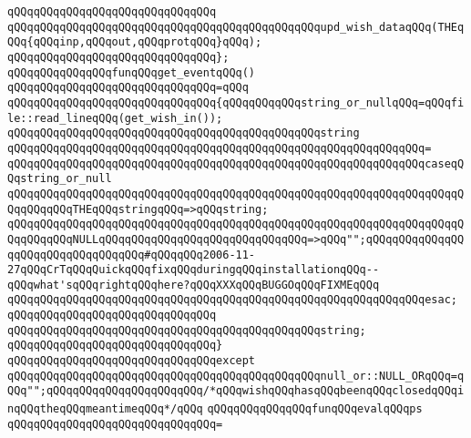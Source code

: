 \verb|qQQqqQQqqQQqqQQqqQQqqQQqqQQqqQQq|\newline
\verb|qQQqqQQqqQQqqQQqqQQqqQQqqQQqqQQqqQQqqQQqqQQqqQQqupd_wish_dataqQQq(THEqQQq{qQQqinp,qQQqout,qQQqprotqQQq}qQQq);|\newline
\verb|qQQqqQQqqQQqqQQqqQQqqQQqqQQqqQQq};|\newline
\newline
\newline
\verb|qQQqqQQqqQQqqQQqfunqQQqget_eventqQQq()|\newline
\verb|qQQqqQQqqQQqqQQqqQQqqQQqqQQqqQQq=qQQq|\newline
\verb|qQQqqQQqqQQqqQQqqQQqqQQqqQQqqQQq{qQQqqQQqqQQqstring_or_nullqQQq=qQQqfile::read_lineqQQq(get_wish_in());|\newline
\newline
\verb|qQQqqQQqqQQqqQQqqQQqqQQqqQQqqQQqqQQqqQQqqQQqqQQqstring|\newline
\verb|qQQqqQQqqQQqqQQqqQQqqQQqqQQqqQQqqQQqqQQqqQQqqQQqqQQqqQQqqQQqqQQq=|\newline
\verb|qQQqqQQqqQQqqQQqqQQqqQQqqQQqqQQqqQQqqQQqqQQqqQQqqQQqqQQqqQQqqQQqcaseqQQqstring_or_null|\newline
\verb|qQQqqQQqqQQqqQQqqQQqqQQqqQQqqQQqqQQqqQQqqQQqqQQqqQQqqQQqqQQqqQQqqQQqqQQqqQQqqQQqTHEqQQqstringqQQq=>qQQqstring;|\newline
\verb|qQQqqQQqqQQqqQQqqQQqqQQqqQQqqQQqqQQqqQQqqQQqqQQqqQQqqQQqqQQqqQQqqQQqqQQqqQQqqQQqNULLqQQqqQQqqQQqqQQqqQQqqQQqqQQqqQQq=>qQQq"";qQQqqQQqqQQqqQQqqQQqqQQqqQQqqQQqqQQq#qQQqqQQq2006-11-27qQQqCrTqQQqQuickqQQqfixqQQqduringqQQqinstallationqQQq--qQQqwhat'sqQQqrightqQQqhere?qQQqXXXqQQqBUGGOqQQqFIXMEqQQq|\newline
\verb|qQQqqQQqqQQqqQQqqQQqqQQqqQQqqQQqqQQqqQQqqQQqqQQqqQQqqQQqqQQqqQQqesac;|\newline
\verb|qQQqqQQqqQQqqQQqqQQqqQQqqQQqqQQq|\newline
\verb|qQQqqQQqqQQqqQQqqQQqqQQqqQQqqQQqqQQqqQQqqQQqqQQqstring;|\newline
\verb|qQQqqQQqqQQqqQQqqQQqqQQqqQQqqQQq}|\newline
\verb|qQQqqQQqqQQqqQQqqQQqqQQqqQQqqQQqexcept|\newline
\verb|qQQqqQQqqQQqqQQqqQQqqQQqqQQqqQQqqQQqqQQqqQQqqQQqnull_or::NULL_ORqQQq=qQQq"";qQQqqQQqqQQqqQQqqQQqqQQq/*qQQqwishqQQqhasqQQqbeenqQQqclosedqQQqinqQQqtheqQQqmeantimeqQQq*/qQQq|\newline
\newline
\verb|qQQqqQQqqQQqqQQqfunqQQqevalqQQqps|\newline
\verb|qQQqqQQqqQQqqQQqqQQqqQQqqQQqqQQq=|\newline
